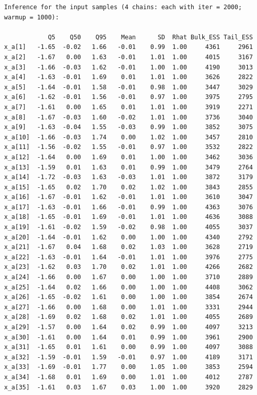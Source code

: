 \documentclass[american,]{article}
\begin{document}
\begin{verbatim}
Inference for the input samples (4 chains: each with iter = 2000; warmup = 1000):

            Q5    Q50    Q95    Mean      SD  Rhat Bulk_ESS Tail_ESS
x_a[1]   -1.65  -0.02   1.66   -0.01    0.99  1.00     4361     2961
x_a[2]   -1.67   0.00   1.63   -0.01    1.01  1.00     4015     3167
x_a[3]   -1.66  -0.03   1.62   -0.01    1.00  1.00     4190     3013
x_a[4]   -1.63  -0.01   1.69    0.01    1.01  1.00     3626     2822
x_a[5]   -1.64  -0.01   1.58   -0.01    0.98  1.00     3447     3029
x_a[6]   -1.62  -0.01   1.56   -0.01    0.97  1.00     3975     2795
x_a[7]   -1.61   0.00   1.65    0.01    1.01  1.00     3919     2271
x_a[8]   -1.67  -0.03   1.60   -0.02    1.01  1.00     3736     3040
x_a[9]   -1.63  -0.04   1.55   -0.03    0.99  1.00     3852     3075
x_a[10]  -1.66  -0.03   1.74    0.00    1.02  1.00     3457     2810
x_a[11]  -1.56  -0.02   1.55   -0.01    0.97  1.00     3532     2822
x_a[12]  -1.64   0.00   1.69    0.01    1.00  1.00     3462     3036
x_a[13]  -1.59   0.01   1.63    0.01    0.99  1.00     3479     2764
x_a[14]  -1.72  -0.03   1.63   -0.03    1.01  1.00     3872     3179
x_a[15]  -1.65   0.02   1.70    0.02    1.02  1.00     3843     2855
x_a[16]  -1.67  -0.01   1.62   -0.01    1.01  1.00     3610     3047
x_a[17]  -1.63  -0.01   1.66   -0.01    0.99  1.00     4363     3076
x_a[18]  -1.65  -0.01   1.69   -0.01    1.01  1.00     4636     3088
x_a[19]  -1.61  -0.02   1.59   -0.02    0.98  1.00     4055     3037
x_a[20]  -1.64  -0.01   1.62    0.00    1.00  1.00     4340     2792
x_a[21]  -1.67   0.04   1.68    0.02    1.03  1.00     3628     2719
x_a[22]  -1.63  -0.01   1.64   -0.01    1.01  1.00     3976     2775
x_a[23]  -1.62   0.03   1.70    0.02    1.01  1.00     4266     2682
x_a[24]  -1.66   0.00   1.67    0.00    1.00  1.00     3710     2889
x_a[25]  -1.64   0.02   1.66    0.00    1.00  1.00     4408     3062
x_a[26]  -1.65  -0.02   1.61    0.00    1.00  1.00     3854     2674
x_a[27]  -1.66   0.00   1.68    0.00    1.01  1.00     3331     2944
x_a[28]  -1.69   0.02   1.68    0.02    1.01  1.00     4055     2689
x_a[29]  -1.57   0.00   1.64    0.02    0.99  1.00     4097     3213
x_a[30]  -1.61   0.00   1.64    0.01    0.99  1.00     3961     2900
x_a[31]  -1.65   0.01   1.61    0.00    0.99  1.00     4097     3088
x_a[32]  -1.59  -0.01   1.59   -0.01    0.97  1.00     4189     3171
x_a[33]  -1.69  -0.01   1.77    0.00    1.05  1.00     3853     2594
x_a[34]  -1.68   0.01   1.69    0.00    1.01  1.00     4012     2787
x_a[35]  -1.61   0.03   1.67    0.03    1.00  1.00     3920     2829

\end{verbatim}
\end{document}
